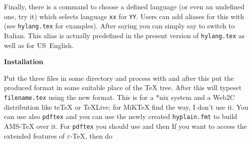 Finally, there is a command to choose a defined language (or even an undefined one, try it)
which selects language {\tt xx} for {\tt YY}. Users can add aliases for this with
(see {\tt hylang.tex} for examples). After saying
you can simply say {\tt{}} to switch to Italian. This alias is actually predefined in
the present version of {\tt hylang.tex} as well as {\tt{}} for US~English.

\bigskip

\centerline{\bf Installation}

\nobreak\medskip

Put the three files in some directory and process with
and after this put the produced format in some suitable place of the \TeX{} tree. After this
will typeset {\tt filename.tex} using the new format. This is for a *nix system and a
{\tensf Web2C} distribution like te\TeX{} or \TeX{}Live; for MiK\TeX{} find the way, I don't
use it. You can use also {\tt pdftex} and you can use the newly created {\tt hyplain.fmt} to
build AMS-\TeX{} over it. For {\tt pdftex} you should use
and then
If you want to access the extended features of $\varepsilon$-\TeX{}, then do

\vfill

\bye
